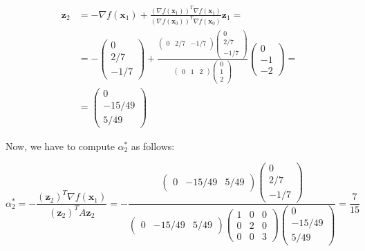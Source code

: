 \documentclass[11pt,a4paper]{article}
\begin{document}
\begin{equation*}
  \begin{aligned}
  \mathbf{z}_2 &= -\nabla f(\mathbf{x}_1) +
  \frac{(\nabla f(\mathbf{x}_1))^T \nabla f(\mathbf{x}_1)}
  {(\nabla f(\mathbf{x}_0))^T\nabla f(\mathbf{x}_0)}
  \mathbf{z}_1
  = \\
  &=
  -
  \begin{pmatrix}
    0 \\
    2/7 \\
    -1/7
  \end{pmatrix}
  +
  \frac{
    \begin{pmatrix}
      0 & 2/7 & -1/7
    \end{pmatrix}
    \begin{pmatrix}
      0 \\
      2/7 \\
      -1/7
    \end{pmatrix}       
  }{
    \begin{pmatrix}
      0 & 1 & 2
    \end{pmatrix}
    \begin{pmatrix}
      0 \\
      1 \\
      2
    \end{pmatrix}
  }
  \begin{pmatrix}
    0 \\
    -1 \\
    -2
  \end{pmatrix}
  = \\
  &=
  \begin{pmatrix}
    0 \\
    -15 / 49 \\
    5 / 49
  \end{pmatrix}
  \end{aligned}
\end{equation*}

Now, we have to compute $\alpha_2^*$ as follows:

\[
  \alpha_2^* = - \frac{(\mathbf{z}_2)^T \nabla f(\mathbf{x}_1)}{(\mathbf{z}_2)^T A \mathbf{z}_2} =
  -
  \frac{
    \begin{pmatrix}
      0 & -15/49 & 5/49
    \end{pmatrix}
    \begin{pmatrix}
      0 \\
      2/7 \\
      -1/7
    \end{pmatrix}
  }
  {
    \begin{pmatrix}
      0 & -15/49 & 5/49
    \end{pmatrix}
    \begin{pmatrix}
      1 & 0 & 0 \\
      0 & 2 & 0 \\
      0 & 0 & 3
    \end{pmatrix}
    \begin{pmatrix}
      0 \\
      -15/49 \\
      5/49
    \end{pmatrix}
  }
  =
  \frac{7}{15}
\]
\end{document}
